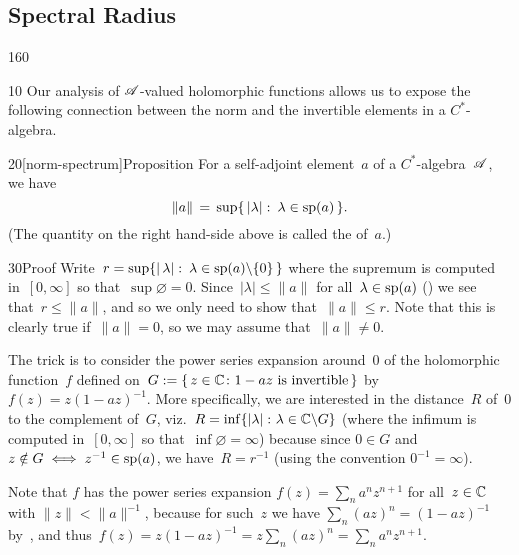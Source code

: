\subsection{Spectral Radius}
\begin{parsec}{160}%
\begin{point}{10}%
Our analysis of $\mathscr{A}$-valued
holomorphic functions
allows us to expose
the following connection
between the norm
and the invertible elements
in a $C^*$-algebra.
\end{point}
\begin{point}{20}[norm-spectrum]{Proposition}%
For a self-adjoint element~$a$ of a $C^*$-algebra~$\mathscr{A}$,
we have
\begin{equation*}
\|a\|\,=\,\sup\{\,\left|\lambda\right|\colon 
\,\lambda\in \mathrm{sp}(a)\,\}.
\end{equation*}
(The quantity on the right hand-side above
is called the  of~$a$.)%
\begin{point}{30}{Proof}%
Write~$r=
\sup\{\left|\,\lambda\right|\colon\, \lambda\in \mathrm{sp}(a)\backslash\{0\}\,\}$
where the supremum is computed
in~$[0,\infty]$ so that~$\sup\varnothing=0$.
Since~$\left|\lambda\right| \leq \|a\|$
for all~$\lambda\in\mathrm{sp}(a)$
()
we see that~$r\leq \|a\|$,
and so we only need to show that~$\|a\|\leq r$. 
Note that this is clearly true if~$\|a\|=0$,
so we may assume that~$\|a\|\neq 0$.

The trick is to consider
the power series expansion
around~$0$ of the holomorphic function~$f$ defined
on~$G:=\{\,z\in \mathbb{C}\colon 1-az\text{ is invertible}\,\}$ 
by  $f(z)=z(1-az)^{-1}$.
More specifically,
we are interested in the distance~$R$
of~$0$ to the complement of~$G$,
viz.~$R= \inf\{\left|\lambda\right|\colon \lambda\in \mathbb{C}\backslash G\}$
(where the infimum is computed in~$[0,\infty]$
so that~$\inf\varnothing=\infty$)
because since $0\in G$
and $z\notin G\iff z^{-1}\in \mathrm{sp}(a)$,
we have~$R=r^{-1}$
(using the convention $0^{-1}=\infty$).

Note that $f$ has the power series expansion
$f(z) = \sum_n a^nz^{n+1}$
for all~$z\in \mathbb{C}$ with $\|z\|<\|a\|^{-1}$,
because for such~$z$
we have $\sum_n (az)^n=(1-az)^{-1}$
by~,
and thus~$f(z)=z(1-az)^{-1}=z\sum_n (az)^n = \sum_n a^nz^{n+1}$.


\end{point}
\end{point}
\end{parsec}

